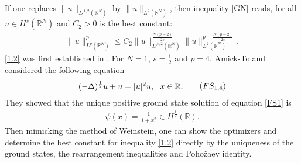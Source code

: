 \documentclass[12pt,a4paper,reqno]{amsart}
\numberwithin{equation}{section}
\begin{document}
$~$\\
If one replaces $\|u\|_{D^{1,2}(\mathbb{R}^{N})}$ by $\|u\|_{L^{2}(\mathbb{R}^{N})}$, then inequality \eqref{GN} reads, for all $u\in H^{s}(\mathbb{R}^{N})$ and $C_{2}>0$ is the best constant:
\begin{equation}\label{1.2}
\begin{aligned}
\|u\|_{L^{p}(\mathbb{R}^{N})}^{p}
\leqslant
C_{2}
\|u\|_{D^{s,2}(\mathbb{R}^{N})}^{\frac{N(p-2)}{2s}}
\|u\|_{L^{2}(\mathbb{R}^{N})}^{p-\frac{N(p-2)}{2s}}.
\end{aligned}
\end{equation}
\eqref{1.2} was first established in \cite{Hajaiej-Molinet-Ozawa-Wang2011}. For $N=1$, $s=\frac{1}{2}$ and $p=4$, Amick-Toland \cite{Amick-Toland1991Acta} considered the following equation
\begin{equation}\label{FS1}
\begin{aligned}
(-\Delta)^{\frac{1}{2}} u+u =|u|^{2}u, \ \ x\in\mathbb{R}.
\end{aligned}
\tag{$FS_{1,4}$}
\end{equation}
They showed that the unique positive ground state solution of equation \eqref{FS1} is
\begin{equation*}
\begin{aligned}
\psi(x)=\frac{1}{1+x^{2}}\in H^{\frac{1}{2}}(\mathbb{R}).
\end{aligned}
\end{equation*}
Then mimicking the method of Weinstein, one can show the optimizers and determine the best constant for inequality \eqref{1.2} directly by the uniqueness of the ground states, the rearrangement inequalities and Poho\v{z}aev identity.
\end{document}
